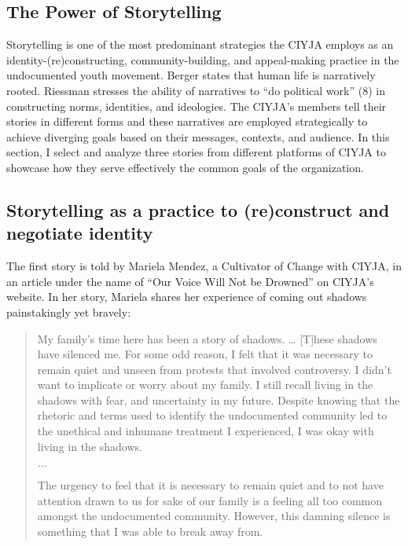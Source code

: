 \documentclass[12pt]{article}
\begin{document}
\begin{flushleft}
\section{The Power of Storytelling}

Storytelling is one of the most predominant strategies the CIYJA employs as an identity-(re)constructing, community-building, and appeal-making practice in the undocumented youth movement.
Berger states that human life is narratively rooted. %
Riessman stresses the ability of narratives to ``do political work'' (8) in constructing norms, identities, and ideologies. %
The CIYJA’s members tell their stories in different forms and these narratives are employed strategically to achieve diverging goals based on their messages, contexts, and audience.
In this section, I select and analyze three stories from different platforms of CIYJA to showcase how they serve effectively the common goals of the organization.

\subsection*{Storytelling as a practice to (re)construct and negotiate identity}

The first story is told by Mariela Mendez, a Cultivator of Change with CIYJA, in an article under the name of ``Our Voice Will Not be Drowned'' on CIYJA's website. In her story, Mariela shares her experience of coming out shadows painstakingly yet bravely:

\begin{quotation}
    \noindent
    My family's time here has been a story of shadows. … [T]hese shadows have silenced me.
    For some odd reason, I felt that it was necessary to remain quiet and unseen from protests that involved controversy. 
    I didn’t want to implicate or worry about my family.
    I still recall living in the shadows with fear, and uncertainty in my future.
    Despite knowing that the rhetoric and terms used to identify the undocumented community led to the unethical and inhumane treatment I experienced, I was okay with living in the shadows.

    \noindent $\ldots$
    
    \noindent
    The urgency to feel that it is necessary to remain quiet and to not have attention drawn to us for sake of our family is a feeling all too common amongst the undocumented community.
    However, this damning silence is something that I was able to break away from.
\end{quotation} %


\end{flushleft}
\end{document}
